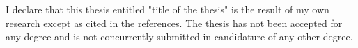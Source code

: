 
\setupindenting[no]
\vfill

I declare that this thesis entitled "title of the thesis" is the result of my
own research except as cited in the references. The thesis has not been
accepted for any degree and is not concurrently submitted in candidature of any
other degree.

\vfill
\setupindenting[yes]
